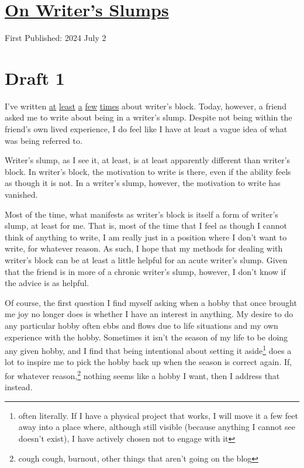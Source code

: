 \documentclass[12pt]{article}[titlepage]
\newcommand{\1}{\={a}}
\newcommand{\2}{\={e}}
\newcommand{\3}{\={\i}}
\newcommand{\4}{\=o}
\newcommand{\5}{\=u}
\newcommand{\6}{\={A}}
\renewcommand{\,}{\textsuperscript{,}}
\begin{document}
\doublespacing
\section{\href{writers-slump.tex}{On Writer's Slumps}}
First Published: 2024 July 2
\section{Draft 1}
I've written \href{writers-block.html}{at} \href{writers-block-2.html}{least} \href{writers-block-3.html}{a} \href{writers-block-4.html}{few} \href{writers-block-5.html}{times} about writer's block.
Today, however, a friend asked me to write about being in a writer's slump.
Despite not being within the friend's own lived experience, I do feel like I have at least a vague idea of what was being referred to.

Writer's slump, as I see it, at least, is at least apparently different than writer's block.
In writer's block, the motivation to write is there, even if the ability feels as though it is not.
In a writer's slump, however, the motivation to write has vanished.

Most of the time, what manifests as writer's block is itself a form of writer's slump, at least for me.
That is, most of the time that I feel as though I cannot think of anything to write, I am really just in a position where I don't want to write, for whatever reason.
As such, I hope that my methods for dealing with writer's block can be at least a little helpful for an acute writer's slump.
Given that the friend is in more of a chronic writer's slump, however, I don't know if the advice is as helpful.

Of course, the first question I find myself asking when a hobby that once brought me joy no longer does is whether I have an interest in anything.
My desire to do any particular hobby often ebbs and flows due to life situations and my own experience with the hobby.
Sometimes it isn't the season of my life to be doing any given hobby, and I find that being intentional about setting it aside\footnote{often literally. If I have a physical project that works, I will move it a few feet away into a place where, although still visible (because anything I cannot see doesn't exist), I have actively chosen not to engage with it} does a lot to inspire me to pick the hobby back up when the season is correct again.
If, for whatever reason,\footnote{cough cough, burnout, other things that aren't going on the blog} nothing seems like a hobby I want, then I address that instead.
\end{document}
